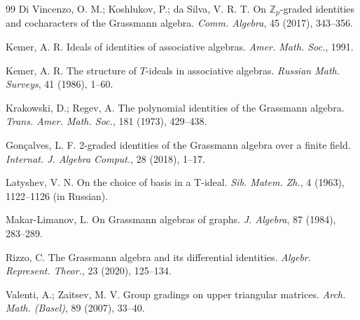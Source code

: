 \documentclass{article}
\begin{document}
\begin{thebibliography}{99}
		 Di Vincenzo, O. M.; Koshlukov, P.; da Silva, V. R. T. On $\mathbb{Z}_p$-graded identities and cocharacters of the Grassmann algebra. \textit{Comm. Algebra}, 45 (2017), 343–356.
		
		 Kemer, A. R. Ideals of identities of associative algebras. \textit{Amer. Math. Soc.}, 1991.
		
		 Kemer, A. R. The structure of $T$-ideals in associative algebras. \textit{Russian Math. Surveys}, 41 (1986), 1–60.
		
		 Krakowski, D.; Regev, A. The polynomial identities of the Grassmann algebra. \textit{Trans. Amer. Math. Soc.}, 181 (1973), 429–438.
		
		 Gonçalves, L. F. 2-graded identities of the Grassmann algebra over a finite field. \textit{Internat. J. Algebra Comput.}, 28 (2018), 1–17.
		
		 Latyshev, V. N. On the choice of basis in a T-ideal. \textit{Sib. Matem. Zh.}, 4 (1963), 1122–1126 (in Russian).
		
		 Makar-Limanov, L. On Grassmann algebras of graphs. \textit{J. Algebra}, 87 (1984), 283–289.
		
		 Rizzo, C. The Grassmann algebra and its differential identities. \textit{Algebr. Represent. Theor.}, 23 (2020), 125–134.
		
		 Valenti, A.; Zaitsev, M. V. Group gradings on upper triangular matrices. \textit{Arch. Math. (Basel)}, 89 (2007), 33–40.
		
	\end{thebibliography}
	
	
	
	
	
	
	
	
	
	
	
	
	
	
	
	
	
	
	
	
	
	
	
	
	
	
	
	
	
	
	
	
	
	
	
	
	
	
	
	
	
	
	
	
	
	
	
	
	
	
	
	
	
	
	
\end{document}
